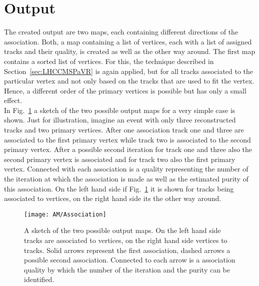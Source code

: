 \section{Output\label{sec:AMOutput}}

The created output are two maps, each containing different directions of the association. Both, a map containing a list of vertices, each with a list of assigned tracks and their quality, is created as well as the other way around. The first map contains a sorted list of vertices. For this, the technique described in Section~\ref{sec:LHCCMSPaVR} is again applied, but for all tracks associated to the particular vertex and not only based on the tracks that are used to fit the vertex. Hence, a different order of the primary vertices is possible but has only a small effect.\\
In Fig.~\ref{plot:AMOutput} a sketch of the two possible output maps for a very simple case is shown. Just for illustration, imagine an event with only three reconstructed tracks and two primary vertices. After one association track one and three are associated to the first primary vertex while track two is associated to the second primary vertex. After a possible second iteration for track one and three also the second primary vertex is associated and for track two also the first primary vertex. Connected with each association is a quality representing the number of the iteration at which the association is made as well as the estimated purity of this association. On the left hand side if Fig.~\ref{plot:AMOutput} it is shown for tracks being associated to vertices, on the right hand side its the other way around.

\begin{figure}[Htb]
    \centering
    \texttt{[image: AM/Association]}
    \caption[Sketch of the two different output maps]{A sketch of the two possible output maps. On the left hand side tracks are associated to vertices, on the right hand side vertices to tracks. Solid arrows represent the first association, dashed arrows a possible second association. Connected to each arrow is a association quality by which the number of the iteration and the purity can be identified. \label{plot:AMOutput}}
\end{figure}
